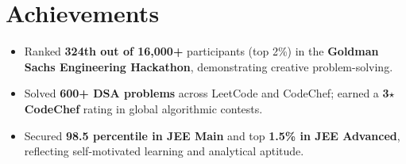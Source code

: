 \documentclass[a4paper,10pt]{article}
\newcommand{\resumeItemListStart}{\begin{itemize}[leftmargin=0.15in, itemsep=0pt, parsep=0pt, topsep=0pt, partopsep=0pt]}
\newcommand{\resumeItemListEnd}{\end{itemize}\vspace{-2pt}}
\newcommand{\resumeItem}[1]{\item\small{#1}}
\begin{document}
\vspace{-14pt}
\section{Achievements}
\resumeItemListStart
    \resumeItem{Ranked \textbf{324th out of 16,000+} participants (top 2\%) in the \textbf{Goldman Sachs Engineering Hackathon}, demonstrating creative problem-solving.}
    \resumeItem{Solved \textbf{600+ DSA problems} across LeetCode and CodeChef; earned a \textbf{3\ensuremath{\star} CodeChef} rating in global algorithmic contests.}
    \resumeItem{Secured \textbf{98.5 percentile in JEE Main} and top \textbf{1.5\% in JEE Advanced}, reflecting self-motivated learning and analytical aptitude.}
\resumeItemListEnd
\end{document}
